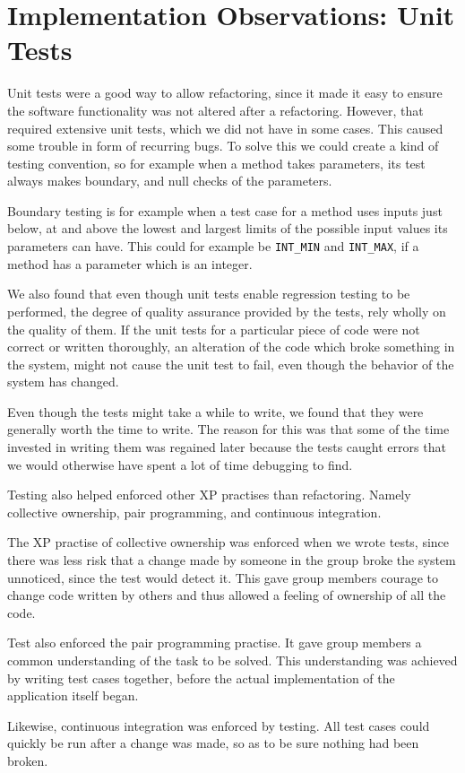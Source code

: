 \section{Implementation Observations: Unit Tests}
\label{sec:testImplObservations}
Unit tests were a good way to allow refactoring, since it made it easy to ensure the software functionality was not altered after a refactoring. However, that required extensive unit tests, which we did not have in some cases. This caused some trouble in form of recurring bugs. To solve this we could create a kind of testing convention, so for example when a method takes parameters, its test always makes boundary, and null checks of the parameters.%

Boundary testing is for example when a test case for a method uses inputs just below, at and above the lowest and largest limits of the possible input values its parameters can have. This could for example be \texttt{INT\_MIN} and \texttt{INT\_MAX}, if a method has a parameter which is an integer.

We also found that even though unit tests enable regression testing to be performed, the degree of quality assurance provided by the tests, rely wholly on the quality of them. If the unit tests for a particular piece of code were not correct or written thoroughly, an alteration of the code which broke something in the system, might not cause the unit test to fail, even though the behavior of the system has changed.

Even though the tests might take a while to write, we found that they were generally worth the time to write. The reason for this was that some of the time invested in writing them was regained later because the tests caught errors that we would otherwise have spent a lot of time debugging to find.


Testing also helped enforced other XP practises than refactoring. Namely collective ownership, pair programming, and continuous integration. 

The XP practise of collective ownership was enforced when we wrote tests, since there was less risk that a change made by someone in the group broke the system unnoticed, since the test would detect it. This gave group members courage to change code written by others and thus allowed a feeling of ownership of all the code. 

Test also enforced the pair programming practise. It gave group members a common understanding of the task to be solved. This understanding was achieved by writing test cases together, before the actual implementation of the application itself began.

Likewise, continuous integration was enforced by testing. All test cases could quickly be run after a change was made, so as to be sure nothing had been broken.

